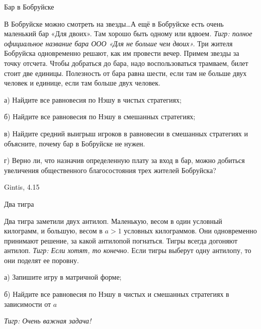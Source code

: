 \begin{problem}
 Бар в Бобруйске \par
В Бобруйске можно смотреть на звезды\ldots А ещё в Бобруйске есть очень маленький бар «Для двоих». Там хорошо быть одному или вдвоем{\it . Тигр: полное официальное название бара ООО «Для не больше чем двоих».} Три жителя Бобруйска одновременно решают, как им провести вечер. Примем звезды за точку отсчета. Чтобы добраться до бара, надо воспользоваться трамваем, билет стоит две единицы. Полезность от бара равна шести, если там не больше двух человек и единице, если там больше двух человек.\par
а) Найдите все равновесия по Нэшу в чистых стратегиях;\par
б) Найдите все равновесия по Нэшу в смешанных стратегиях;\par
в) Найдите средний выигрыш игроков в равновесии в смешанных стратегиях и объясните, почему бар в Бобруйске не нужен.\par
г) Верно ли, что назначив определенную плату за вход в бар, можно добиться увеличения общественного благосостояния трех жителей Бобруйска?



\begin{sol}

\end{sol}
\end{problem}


\begin{source}
Gintis, 4.15
\end{source}



\begin{problem}
 Два тигра\par
Два тигра заметили двух антилоп. Маленькую, весом в один условный килограмм, и большую, весом в  $a>1$  условных килограммов. Они одновременно принимают решение, за какой антилопой погнаться. Тигры всегда догоняют антилоп. {\it Тигр: Если хотят, то конечно.} Если тигры выберут одну антилопу, то они поделят ее поровну.\par
а) Запишите игру в матричной форме;\par
б) Найдите все равновесия по Нэшу в чистых и смешанных стратегиях в зависимости от  $a$\par
{\it Тигр: Очень важная задача!}\par



\begin{sol}

\end{sol}
\end{problem}



